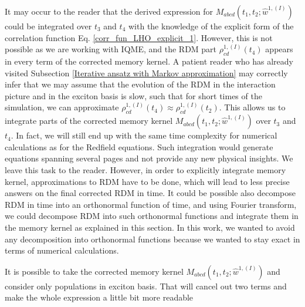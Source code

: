 It may occur to the reader that the derived expression for $M_{abcd}(t_1, t_2; \hat{w}^{1,(I)})$ could be integrated over $t_3$ and $t_4$ with the knowledge of the explicit form of the correlation function Eq. \ref{corr_fun_LHO_explicit_1}. However, this is not possible as we are working with IQME, and the RDM part $\rho_{ c d }^{ 1,(I) }(t_4)$ appears in every term of the corrected memory kernel. A patient reader who has already visited Subsection \ref{Iterative ansatz with Markov approximation} may correctly infer that we may assume that the evolution of the RDM in the interaction picture and in the exciton basis is slow, such that for short times of the simulation, we can approximate $\rho_{ c d }^{ 1,(I) }(t_4) \approx \rho_{ c d }^{ 1,(I) }(t_2)$. This allows us to integrate parts of the corrected memory kernel $M_{abcd}(t_1, t_2; \hat{w}^{1,(I)})$ over $t_3$ and $t_4$. In fact, we will still end up with the same time complexity for numerical calculations as for the Redfield equations. Such integration would generate equations spanning several pages and not provide any new physical insights. We leave this task to the reader. However, in order to explicitly integrate memory kernel, approximations to RDM have to be done, which will lead to less precise answers on the final corrected RDM in time. It could be possible also decompose RDM in time into an orthonormal function of time, and using Fourier transform, we could decompose RDM into such orthonormal functions and integrate them in the memory kernel as explained in this section. In this work, we wanted to avoid any decomposition into orthonormal functions because we wanted to stay exact in terms of numerical calculations. 

It is possible to take the corrected memory kernel $M_{abcd}(t_1, t_2; \hat{w}^{1,(I)})$ and consider only populations in exciton basis. That will cancel out two terms and make the whole expression a little bit more readable

